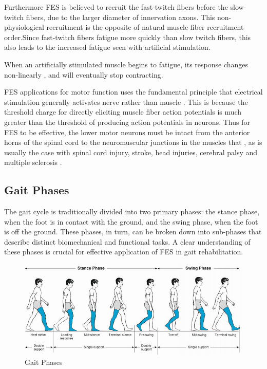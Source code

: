Furthermore FES is believed to recruit the fast-twitch fibers before the slow-twitch fibers, due to the larger diameter of innervation axons. This non-physiological recruitment is the opposite of natural muscle-fiber recruitment order.Since fast-twitch fibers fatigue more quickly than slow twitch fibers, this also leads to the increased fatigue seen with artificial stimulation. \cite{lynch_functional_2008}

When an artificially stimulated muscle begins to fatigue, its response changes non-linearly \cite{lynch_functional_2008}, and will eventually stop contracting. 

FES applications for motor function uses the fundamental principle that electrical stimulation generally activates nerve rather than muscle \cite{peckham_functional_2005}. This is because the threshold charge for directly eliciting muscle fiber action potentials is much greater than the threshold of producing action potentials in neurons. Thus for FES to be effective, the lower motor neurons must be intact from the anterior horns of the spinal cord to the neuromuscular junctions in the muscles that , as is usually the case with spinal cord injury, stroke, head injuries, cerebral palsy and multiple sclerosis \cite{gregory_recruitment_2005}. 

\subsection{Gait Phases}
The gait cycle is traditionally divided into two primary phases: the stance phase, when the foot is in contact with the ground, and the swing phase, when the foot is off the ground. These phases, in turn, can be broken down into sub-phases that describe distinct biomechanical and functional tasks. A clear understanding of these phases is crucial for effective application of FES in gait rehabilitation.

\begin{figure}
    \centering
    \includegraphics[width=0.9\linewidth]{images/Phases-of-the-normal-gait-cycle.png}
    \caption{Gait Phases \cite{pirker_gait_2017}}
    \label{fig:enter-label}
\end{figure}

